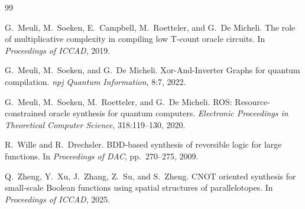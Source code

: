 \documentclass[UTF8,fontset=macnew,11pt]{ctexart}
\begin{document}
\begin{thebibliography}{99}

G.~Meuli, M.~Soeken, E.~Campbell, M.~Roetteler, and G.~De Micheli.
\newblock The role of multiplicative complexity in compiling low T-count oracle circuits.
\newblock In \emph{Proceedings of ICCAD}, 2019.

G.~Meuli, M.~Soeken, and G.~De Micheli.
\newblock Xor-And-Inverter Graphs for quantum compilation.
\newblock \emph{npj Quantum Information}, 8:7, 2022.

G.~Meuli, M.~Soeken, M.~Roetteler, and G.~De Micheli.
\newblock ROS: Resource-constrained oracle synthesis for quantum computers.
\newblock \emph{Electronic Proceedings in Theoretical Computer Science}, 318:119--130, 2020.

R.~Wille and R.~Drechsler.
\newblock BDD-based synthesis of reversible logic for large functions.
\newblock In \emph{Proceedings of DAC}, pp.~270--275, 2009.

Q.~Zheng, Y.~Xu, J.~Zhang, Z.~Su, and S.~Zheng.
\newblock CNOT oriented synthesis for small-scale Boolean functions using spatial structures of parallelotopes.
\newblock In \emph{Proceedings of ICCAD}, 2025.

\end{thebibliography}
\end{document}
